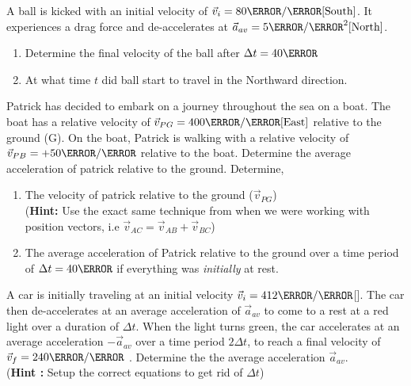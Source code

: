 \documentclass[12pt]{article} %
\newcommand{\tx}[1]{\text{#1}}
\begin{document}
\begin{qstn}[6]
 A ball is kicked with an initial velocity of $\vec v_i = 80 \m / \s \tx{[South]}$. It experiences a drag force and de-accelerates at $\vec a_{av} = 5 \m / \s^2 \tx{[North]}$.
            \begin{enumerate}[label = (\alph*)]
                \item Determine the final velocity of the ball after $\Delta t = 40\s$
                \item At what time $t$ did ball start to travel in the Northward direction.
            \end{enumerate}
\end{qstn}
        

 \begin{qstn}[7]
    Patrick has decided to embark on a journey throughout the sea on a boat. The boat has a relative velocity of $\vec v_{PG} = 400 \m / \s\tx{[East]}$ relative to the ground (G). On the boat, Patrick is walking with a relative velocity of $\vec v_{PB} = +50 \m / \s$ relative to the boat. Determine the average acceleration of patrick relative to the ground. Determine,
    \begin{enumerate}[label = (\alph*)]
        \item The velocity of patrick relative to the ground ($\vec v_{PG}$)\\
        (\textbf{Hint: }Use the exact same technique from when we were working with position vectors, i.e $\vec v_{AC} = \vec v_{AB} + \vec v_{BC}$)
        \item The average acceleration of Patrick relative to the ground over a time period of $\Delta t = 40\s$ if everything was \emph{initially} at rest.

    \end{enumerate}

 \end{qstn}




\begin{qstn}[8]
    A car is initially traveling at an initial velocity $\vec v_i = 412 \m / \s$[\tx{East}]. The car then de-accelerates at an average acceleration of $\vec a_{av}$ to come to a rest at a red light over a duration of $\Delta t$. When the light turns green, the car accelerates at an average acceleration $-\vec a_{av}$ over a time period $2\Delta t$, to reach a final velocity of $\vec v_f = 240 \m / \s$ \tx{[East]} . Determine the the average acceleration $\vec a_{av}$. \\(\textbf{Hint :} Setup the correct equations to get rid of $\Delta t$) 
 \end{qstn}
\end{document}

